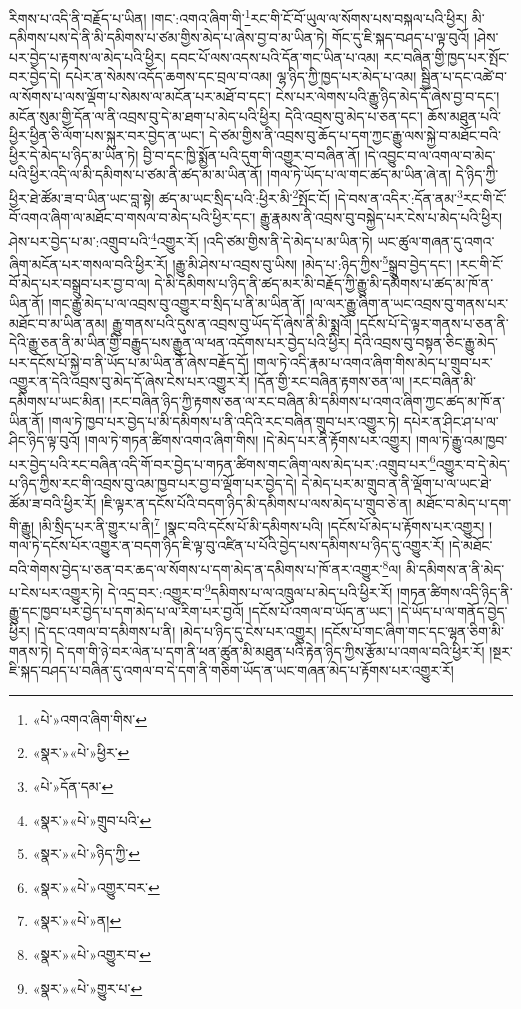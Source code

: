 རིགས་པ་འདི་ནི་བརྗོད་པ་ཡིན། །གང་:འགའ་ཞིག་གི་\footnote{«པེ་»འགའ་ཞིག་གིས་}རང་གི་ངོ་བོ་ཡུལ་ལ་སོགས་པས་བསྐལ་པའི་ཕྱིར། མི་དམིགས་པས་དེ་ནི་མི་དམིགས་པ་ཙམ་གྱིས་མེད་པ་ཞེས་བྱ་བ་མ་ཡིན་ཏེ། གོང་དུ་ཇི་སྐད་བཤད་པ་ལྟ་བུའོ། །ཤེས་པར་བྱེད་པ་རྟགས་ལ་མེད་པའི་ཕྱིར། དབང་པོ་ལས་འདས་པའི་དོན་གང་ཡིན་པ་འམ། རང་བཞིན་གྱི་ཁྱད་པར་སྤོང་བར་བྱེད་དེ། དཔེར་ན་སེམས་འདོད་ཆགས་དང་བྲལ་བ་འམ། ལྷ་ཉིད་ཀྱི་ཁྱད་པར་མེད་པ་འམ། སྦྱིན་པ་དང་འཚེ་བ་ལ་སོགས་པ་ལས་ལྡོག་པ་སེམས་ལ་མངོན་པར་མཐོ་བ་དང་། ངེས་པར་ལེགས་པའི་རྒྱུ་ཉིད་མེད་དོ་ཞེས་བྱ་བ་དང་། མངོན་སུམ་གྱི་དོན་ལ་ནི་འབྲས་བུ་དེ་མ་ཐག་པ་མེད་པའི་ཕྱིར། དེའི་འབྲས་བུ་མེད་པ་ཅན་དང་། ཆོས་མཐུན་པའི་ཕྱིར་ཕྱིན་ཅི་ལོག་པས་སྐུར་བར་བྱེད་ན་ཡང་། དེ་ཙམ་གྱིས་ནི་འབྲས་བུ་ཆོད་པ་དག་ཀྱང་རྒྱུ་ལས་སྐྱེ་བ་མཐོང་བའི་ཕྱིར་དེ་མེད་པ་ཉིད་མ་ཡིན་ཏེ། བྱི་བ་དང་ཁྱི་སྨྱོན་པའི་དུག་གི་འགྱུར་བ་བཞིན་ནོ། །དེ་འབྱུང་བ་ལ་འགལ་བ་མེད་པའི་ཕྱིར་འདི་ལ་མི་དམིགས་པ་ཙམ་ནི་ཚད་མ་མ་ཡིན་ནོ། །གལ་ཏེ་ཡོད་པ་ལ་གང་ཚད་མ་ཡིན་ཞེ་ན། དེ་ཉིད་ཀྱི་ཕྱིར་ཐེ་ཚོམ་ཟ་བ་ཡིན་ཡང་བླ་སྟེ། ཚད་མ་ཡང་སྲིད་པའི་:ཕྱིར་མི་\footnote{«སྣར་»«པེ་»ཕྱིར་}སྤོང་ངོ། །དེ་བས་ན་འདིར་:དོན་ནམ་\footnote{«པེ་»དོན་དམ་}རང་གི་ངོ་བོ་འགའ་ཞིག་ལ་མཐོང་བ་གསལ་བ་མེད་པའི་ཕྱིར་དང་། རྒྱུ་རྣམས་ནི་འབྲས་བུ་བསྐྱེད་པར་ངེས་པ་མེད་པའི་ཕྱིར། ཤེས་པར་བྱེད་པ་མ་:འགྲུབ་པའི་\footnote{«སྣར་»«པེ་»གྲུབ་པའི་}འགྱུར་རོ། །འདི་ཙམ་གྱིས་ནི་དེ་མེད་པ་མ་ཡིན་ཏེ། ཡང་ཚུལ་གཞན་དུ་འགའ་ཞིག་མངོན་པར་གསལ་བའི་ཕྱིར་རོ། །རྒྱུ་མི་ཤེས་པ་འབྲས་བུ་ཡིས། །མེད་པ་:ཉིད་ཀྱིས་\footnote{«སྣར་»«པེ་»ཉིད་ཀྱི་}སྒྲུབ་བྱེད་དང་། །རང་གི་ངོ་བོ་མེད་པར་བསྒྲུབ་པར་བྱ་བ་ལ། དེ་མི་དམིགས་པ་ཉིད་ནི་ཚད་མར་མི་བརྗོད་ཀྱི་རྒྱུ་མི་དམིགས་པ་ཚད་མ་ཁོ་ན་ཡིན་ནོ། །གང་རྒྱུ་མེད་པ་ལ་འབྲས་བུ་འགྱུར་བ་སྲིད་པ་ནི་མ་ཡིན་ནོ། །ལ་ལར་རྒྱུ་ཞིག་ན་ཡང་འབྲས་བུ་གནས་པར་མཐོང་བ་མ་ཡིན་ནམ། རྒྱུ་གནས་པའི་དུས་ན་འབྲས་བུ་ཡོད་དོ་ཞེས་ནི་མི་སྨྲའོ། །དངོས་པོ་དེ་ལྟར་གནས་པ་ཅན་ནི་དེའི་རྒྱུ་ཅན་ནི་མ་ཡིན་གྱི་བརྒྱུད་པས་རྒྱུན་ལ་ཕན་འདོགས་པར་བྱེད་པའི་ཕྱིར། དེའི་འབྲས་བུ་བསྟན་ཅིང་རྒྱུ་མེད་པར་དངོས་པོ་སྐྱེ་བ་ནི་ཡོད་པ་མ་ཡིན་ནོ་ཞེས་བརྗོད་དོ། །གལ་ཏེ་འདི་རྣམ་པ་འགའ་ཞིག་གིས་མེད་པ་གྲུབ་པར་འགྱུར་ན་དེའི་འབྲས་བུ་མེད་དོ་ཞེས་ངེས་པར་འགྱུར་རོ། །དོན་གྱི་རང་བཞིན་རྟགས་ཅན་ལ། །རང་བཞིན་མི་དམིགས་པ་ཡང་མིན། །རང་བཞིན་ཉིད་ཀྱི་རྟགས་ཅན་ལ་རང་བཞིན་མི་དམིགས་པ་འགའ་ཞིག་ཀྱང་ཚད་མ་ཁོ་ན་ཡིན་ནོ། །གལ་ཏེ་ཁྱབ་པར་བྱེད་པ་མི་དམིགས་པ་ནི་འདིའི་རང་བཞིན་གྲུབ་པར་འགྱུར་ཏེ། དཔེར་ན་ཤིང་ཤ་པ་ལ་ཤིང་ཉིད་ལྟ་བུའོ། །གལ་ཏེ་གཏན་ཚིགས་འགའ་ཞིག་གིས། །དེ་མེད་པར་ནི་རྟོགས་པར་འགྱུར། །གལ་ཏེ་རྒྱུ་འམ་ཁྱབ་པར་བྱེད་པའི་རང་བཞིན་འདི་གོ་བར་བྱེད་པ་གཏན་ཚིགས་གང་ཞིག་ལས་མེད་པར་:འགྲུབ་པར་\footnote{«སྣར་»«པེ་»འགྱུར་བར་}འགྱུར་བ་དེ་མེད་པ་ཉིད་ཀྱིས་རང་གི་འབྲས་བུ་འམ་ཁྱབ་པར་བྱ་བ་ལྡོག་པར་བྱེད་དེ། དེ་མེད་པར་མ་གྲུབ་ན་ནི་ལྡོག་པ་ལ་ཡང་ཐེ་ཚོམ་ཟ་བའི་ཕྱིར་རོ། །ཇི་ལྟར་ན་དངོས་པོའི་བདག་ཉིད་མི་དམིགས་པ་ལས་མེད་པ་གྲུབ་ཅེ་ན། མཐོང་བ་མེད་པ་དག་གི་རྒྱུ། །མི་སྲིད་པར་ནི་གྱུར་པ་ནི།\footnote{«སྣར་»«པེ་»ན།} །སྣང་བའི་དངོས་པོ་མི་དམིགས་པའི། །དངོས་པོ་མེད་པ་རྟོགས་པར་འགྱུར། །གལ་ཏེ་དངོས་པོར་འགྱུར་ན་བདག་ཉིད་ཇི་ལྟ་བུ་འཛིན་པ་པོའི་བྱེད་པས་དམིགས་པ་ཉིད་དུ་འགྱུར་རོ། །དེ་མཐོང་བའི་གེགས་བྱེད་པ་ཅན་བར་ཆད་ལ་སོགས་པ་དག་མེད་ན་དམིགས་པ་ཁོ་ནར་འགྱུར་\footnote{«སྣར་»«པེ་»འགྱུར་བ་}ལ། མི་དམིགས་ན་ནི་མེད་པ་ངེས་པར་འགྱུར་ཏེ། དེ་འདྲ་བར་:འགྱུར་བ་\footnote{«སྣར་»«པེ་»གྱུར་པ་}དམིགས་པ་ལ་འཁྲུལ་པ་མེད་པའི་ཕྱིར་རོ། །གཏན་ཚིགས་འདི་ཉིད་ནི་རྒྱུ་དང་ཁྱབ་པར་བྱེད་པ་དག་མེད་པ་ལ་རིག་པར་བྱའོ། །དངོས་པོ་འགལ་བ་ཡོད་ན་ཡང་། །དེ་ཡོད་པ་ལ་གནོད་བྱེད་ཕྱིར། །དེ་དང་འགལ་བ་དམིགས་པ་ནི། །མེད་པ་ཉིད་དུ་ངེས་པར་འགྱུར། །དངོས་པོ་གང་ཞིག་གང་དང་ལྷན་ཅིག་མི་གནས་ཏེ། དེ་དག་གི་ཉེ་བར་ལེན་པ་དག་ནི་ཕན་ཚུན་མི་མཐུན་པའི་རྟེན་ཉིད་ཀྱིས་རྩོམ་པ་འགལ་བའི་ཕྱིར་རོ། །སྔར་ཇི་སྐད་བཤད་པ་བཞིན་དུ་འགལ་བ་དེ་དག་ནི་གཅིག་ཡོད་ན་ཡང་གཞན་མེད་པ་རྟོགས་པར་འགྱུར་རོ། 